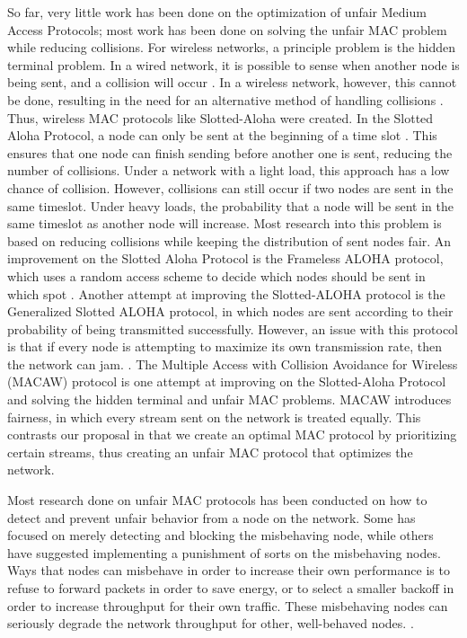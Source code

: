 \documentclass{sigcomm-alternate}
\begin{document}
So far, very little work has been done on the optimization of unfair Medium Access Protocols; most work has been done on solving the unfair MAC problem while reducing collisions. For wireless networks, a principle problem is the hidden terminal problem. In a wired network, it is possible to sense when another node is being sent, and a collision will occur \cite{869217}. In a wireless network, however, this cannot be done, resulting in the need for an alternative method of handling collisions \cite{6574961}. Thus, wireless MAC protocols like Slotted-Aloha were created.  In the Slotted Aloha Protocol, a node can only be sent at the beginning of a time slot \cite{5340799}. This ensures that one node can finish sending before another one is sent, reducing the number of collisions.  Under a network with a light load, this approach has a low chance of collision. However, collisions can still occur if two nodes are sent in the same timeslot. Under heavy loads, the probability that a node will be sent in the same timeslot as another node will increase. Most research into this problem is based on reducing collisions while keeping the distribution of sent nodes fair.  An improvement on the Slotted Aloha Protocol is the Frameless ALOHA protocol, which uses a random access scheme to decide which nodes should be sent in which spot \cite{6336861}. Another attempt at improving the Slotted-ALOHA protocol is the Generalized Slotted ALOHA protocol, in which nodes are sent according to their probability of being transmitted successfully. However, an issue with this protocol is that if every node is attempting to maximize its own transmission rate, then the network can jam. \cite{4548143 }.  The Multiple Access with Collision Avoidance for Wireless (MACAW) protocol is one attempt at improving on the Slotted-Aloha Protocol and solving the hidden terminal and unfair MAC problems. MACAW introduces fairness, in which every stream sent on the network is treated equally. This contrasts our proposal in that we create an optimal MAC protocol by prioritizing certain streams, thus creating an unfair MAC protocol that optimizes the network.

Most research done on unfair MAC protocols has been conducted on how to detect and prevent unfair behavior from a node on the network. Some has focused on merely detecting and blocking the misbehaving node, while others have suggested implementing a punishment of sorts on the misbehaving nodes. Ways that nodes can misbehave in order to increase their own performance is to refuse to forward packets in order to save energy, or to select a smaller backoff in order to increase throughput for their own traffic. These misbehaving nodes can seriously degrade the network throughput for other, well-behaved nodes. \cite{Kyasanur}.   \\
\end{document}
